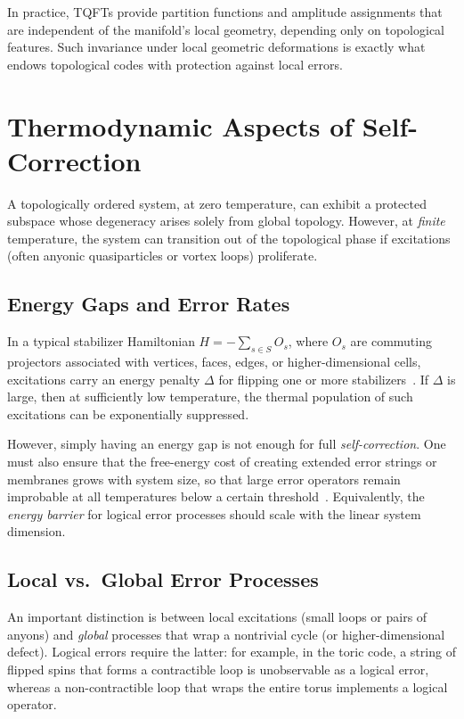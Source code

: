 \documentclass[12pt]{article}
\begin{document}
In practice, TQFTs provide partition functions and amplitude assignments that are independent of the manifold’s local geometry, depending only on topological features. Such invariance under local geometric deformations is exactly what endows topological codes with protection against local errors.

\section{Thermodynamic Aspects of Self-Correction}\label{sec:qec_thermo}
A topologically ordered system, at zero temperature, can exhibit a protected subspace whose degeneracy arises solely from global topology. However, at \emph{finite} temperature, the system can transition out of the topological phase if excitations (often anyonic quasiparticles or vortex loops) proliferate. 

\subsection{Energy Gaps and Error Rates}
In a typical stabilizer Hamiltonian $H = -\sum_{s\in S} O_s$, where $O_s$ are commuting projectors associated with vertices, faces, edges, or higher-dimensional cells, excitations carry an energy penalty $\Delta$ for flipping one or more stabilizers~\cite{kitaev2003fault, dennis2002topological}. If $\Delta$ is large, then at sufficiently low temperature, the thermal population of such excitations can be exponentially suppressed.

However, simply having an energy gap is not enough for full \emph{self-correction}. One must also ensure that the free-energy cost of creating extended error strings or membranes grows with system size, so that large error operators remain improbable at all temperatures below a certain threshold~\cite{brown2020quantum}. Equivalently, the \emph{energy barrier} for logical error processes should scale with the linear system dimension.

\subsection{Local vs.\ Global Error Processes}
An important distinction is between local excitations (small loops or pairs of anyons) and \emph{global} processes that wrap a nontrivial cycle (or higher-dimensional defect). Logical errors require the latter: for example, in the toric code, a string of flipped spins that forms a contractible loop is unobservable as a logical error, whereas a non-contractible loop that wraps the entire torus implements a logical operator.
\end{document}
